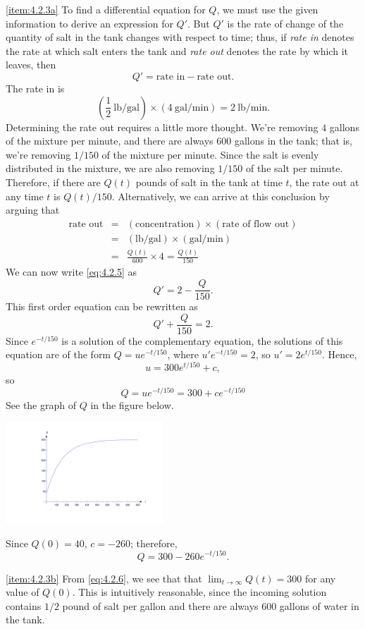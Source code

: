 \documentclass{ximera}
\begin{document}
\begin{example}
\begin{explanation} \ref{item:4.2.3a} To find a differential equation for $Q$, we must use
the given information to derive an expression for $Q'$. But $Q'$
is the rate of change of the quantity of salt in the tank changes with
respect to time;
  thus, if \textit{rate in} denotes the rate at which
salt enters
the tank and \textit{rate out} denotes the rate by which it
leaves, then
\begin{equation} \label{eq:4.2.5}
Q' = \mbox{rate in}-\mbox{rate out}.
\end{equation}
The rate in is
$$
\left(\frac{1}{2}\  \mbox{lb/gal}\right) \times (4\  \mbox{gal/min}) = 2\
\mbox{lb/min}.
$$
Determining the rate out requires a little more thought. We're
removing $4$ gallons of the mixture per minute, and there are always $600$
gallons in the tank; that is, we're removing $1/150$ of the mixture
per minute. Since the salt is evenly distributed in the mixture, we
are also removing $1/150$ of the salt per minute. Therefore, if there
are $Q(t)$ pounds of salt in the tank at time $t$, the rate out
at any time $t$ is $Q(t)/150$. Alternatively, we can arrive at this
conclusion by arguing that
$$
\begin{array}{lcl}
\mbox{rate out} & = & (\mbox{concentration})\times(\mbox{rate of
flow out})\\ \mbox{}&=&(\mbox{lb/gal})\times(\mbox{gal/min})\\
&=&\frac{Q(t)}{600}\times
4=\frac{Q(t)}{150}
\end{array}
$$
 We can now
write \eqref{eq:4.2.5} as
$$
Q' = 2-\frac{Q}{150}.
$$
This first order equation can be rewritten as
$$
Q'+\frac{Q}{150} = 2.
$$
Since $e^{-t/150}$ is a solution of the complementary equation, the
solutions of this equation are of the form  $Q=ue^{-t/150}$, where
$u'e^{-t/150}=2$, so $u'=2e^{t/150}$. Hence,
$$
u = 300e^{t/150}+c,
$$
 so
\begin{equation} \label{eq:4.2.6}
Q=ue^{-t/150}=300+ce^{-t/150}
\end{equation}
See the graph of $Q$ in the figure below.

\begin{image}
  \includegraphics[height=1.5in]{fig040204.jpg} 
\end{image}

 Since $Q(0)=40$,  $c=-260$;  therefore,
$$
Q=300-260e^{-t/150}.
$$


\ref{item:4.2.3b} From \eqref{eq:4.2.6}, we see that that $\lim_{t \rightarrow
\infty}Q(t)=300$ for any value of  $Q(0)$. This is
intuitively reasonable, since the incoming solution contains $1/2$
pound of salt per gallon and there are always 600 gallons of water in
the tank. 
\end{explanation}
\end{example}
\end{document}
